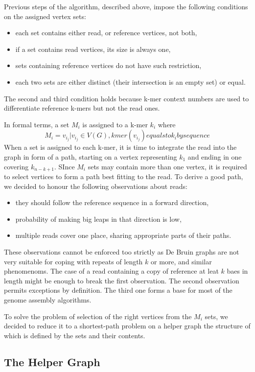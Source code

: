 Previous steps of the algorithm, described above, impose the following conditions on the assigned vertex sets:
\begin{itemize}
\item each set contains either read, or reference vertices, not both,
\item if a set contains read vertices, its size is always one,
\item sets containing reference vertices do not have such restriction,
\item each two sets are either distinct (their intersection is an empty set) or equal.
\end{itemize}
The second and third condition holds because k-mer context numbers are used to differentiate reference k-mers but not the read ones. 

In formal terms, a set $M_i$ is assigned to a k-mer $k_i$ where
$$
M_i = {v_{i_j} | v_{i_j} \in V(G), kmer(v_{i_j}) equals to k_i by sequence}
$$ 
When a set is assigned to each k-mer, it is time to integrate the read into the graph in form of a path, starting on a vertex representing $k_1$ and ending in one covering $k_{n-k+1}$. SInce $M_i$ sets may contain more than one vertex, it is required to select vertices to form a path best fitting to the read. To derive a good path, we decided to honour the following observations about reads:
\begin{itemize}
\item they should follow the reference sequence in a forward direction,
\item probability of making big leaps in that direction is low,
\item multiple reads cover one place, sharing appropriate parts of their paths.
\end{itemize}

These observations cannot be enforced too strictly as De Bruin graphs are not very suitable for coping with repeats of length $k$ or more, and similar phenomenoms. The case of a read containing a copy of reference at leat $k$ baes in length might be enough to break the first observation. The second observation permits exceptions by definition. The third one forms a base for most of the genome assembly algorithms.

To solve the problem of selection of the right vertices from the $M_i$ sets, we decided to reduce it to a shortest-path problem on a helper graph the structure of which is defined by the sets and their contents.

\subsection{The Helper Graph}
\label{subsec:helper-graph}

